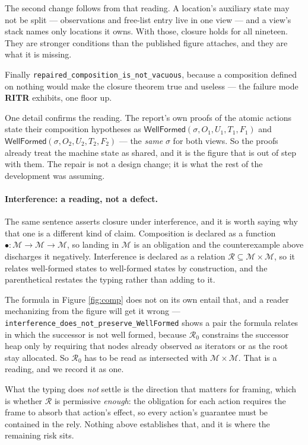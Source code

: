 The second change follows from that reading.  A location's auxiliary state may
not be split --- observations and free-list entry live in one view --- and a
view's stack names only locations it owns.  With those, closure holds for all
nineteen.  They are stronger conditions than the published figure attaches, and
they are what it is missing.

Finally \texttt{repaired\_composition\_is\_not\_vacuous}, because a composition
defined on nothing would make the closure theorem true and useless --- the
failure mode \textbf{RITR} exhibits, one floor up.

One detail confirms the reading.  The report's own proofs of the atomic actions
state their composition hypotheses as $\textsf{WellFormed}(\sigma, O_1, U_1,
T_1, F_1)$ and $\textsf{WellFormed}(\sigma, O_2, U_2, T_2, F_2)$ --- the
\emph{same} $\sigma$ for both views.  So the proofs already treat the machine
state as shared, and it is the figure that is out of step with them.  The repair
is not a design change; it is what the rest of the development was assuming.

\paragraph{Interference: a reading, not a defect.}  The same sentence asserts
closure under interference, and it is worth saying why that one is a different
kind of claim.  Composition is declared as a function $\bullet : \mathcal{M}
\rightarrow \mathcal{M} \rightarrow \mathcal{M}$, so landing in $\mathcal{M}$ is
an obligation and the counterexample above discharges it negatively.
Interference is declared as a relation $\mathcal{R} \subseteq \mathcal{M} \times
\mathcal{M}$, so it relates well-formed states to well-formed states by
construction, and the parenthetical restates the typing rather than adding to
it.

The formula in Figure \ref{fig:comp} does not on its own entail that, and a
reader mechanizing from the figure will get it wrong ---
\texttt{interference\_does\_not\_preserve\_WellFormed} shows a pair the formula
relates in which the successor is not well formed, because
$\mathcal{R}_0$ constrains the successor heap only by requiring that nodes
already observed as iterators or as the root stay allocated.  So $\mathcal{R}_0$
has to be read as intersected with $\mathcal{M} \times \mathcal{M}$.  That is a
reading, and we record it as one.

What the typing does \emph{not} settle is the direction that matters for
framing, which is whether $\mathcal{R}$ is permissive \emph{enough}: the
obligation for each action requires the frame to absorb that action's effect,
so every action's guarantee must be contained in the rely.  Nothing above
establishes that, and it is where the remaining risk sits.


